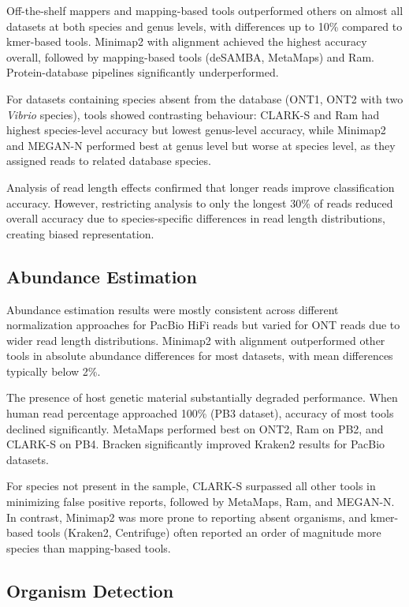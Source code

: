 \documentclass[11pt]{article}
\begin{document}
Off-the-shelf mappers and mapping-based tools outperformed others on almost all datasets at both species and genus levels, with differences up to 10\% compared to kmer-based tools. Minimap2 with alignment achieved the highest accuracy overall, followed by mapping-based tools (deSAMBA, MetaMaps) and Ram. Protein-database pipelines significantly underperformed.

For datasets containing species absent from the database (ONT1, ONT2 with two \textit{Vibrio} species), tools showed contrasting behaviour: CLARK-S and Ram had highest species-level accuracy but lowest genus-level accuracy, while Minimap2 and MEGAN-N performed best at genus level but worse at species level, as they assigned reads to related database species.

Analysis of read length effects confirmed that longer reads improve classification accuracy. However, restricting analysis to only the longest 30\% of reads reduced overall accuracy due to species-specific differences in read length distributions, creating biased representation.

\subsection{Abundance Estimation}

Abundance estimation results were mostly consistent across different normalization approaches for PacBio HiFi reads but varied for ONT reads due to wider read length distributions. Minimap2 with alignment outperformed other tools in absolute abundance differences for most datasets, with mean differences typically below 2\%.

The presence of host genetic material substantially degraded performance. When human read percentage approached 100\% (PB3 dataset), accuracy of most tools declined significantly. MetaMaps performed best on ONT2, Ram on PB2, and CLARK-S on PB4. Bracken significantly improved Kraken2 results for PacBio datasets.

For species not present in the sample, CLARK-S surpassed all other tools in minimizing false positive reports, followed by MetaMaps, Ram, and MEGAN-N. In contrast, Minimap2 was more prone to reporting absent organisms, and kmer-based tools (Kraken2, Centrifuge) often reported an order of magnitude more species than mapping-based tools.

\subsection{Organism Detection}
\end{document}
